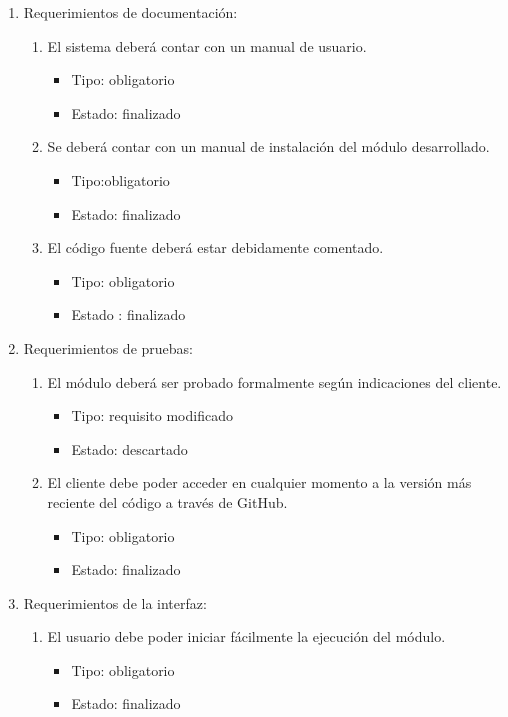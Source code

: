 \begin{enumerate}
\item Requerimientos de documentación:
\begin{enumerate}
	\item El sistema deberá contar con un manual de usuario.
	\begin{itemize}
		\item Tipo: obligatorio
		\item Estado: finalizado
	\end{itemize}
	\item Se deberá contar con un manual de instalación del módulo desarrollado.
	\begin{itemize}
	 \item Tipo:obligatorio
	 \item Estado: finalizado
	\end{itemize}
	\item El código fuente deberá estar debidamente comentado.
	\begin{itemize}
		\item Tipo: obligatorio
		\item Estado : finalizado
	\end{itemize}
\end{enumerate}
\item Requerimientos de pruebas:
\begin{enumerate}
	\item El módulo deberá ser probado formalmente según indicaciones del cliente.
	\begin{itemize}
		\item Tipo: requisito modificado
		\item Estado: descartado
	\end{itemize}
	\item El cliente debe poder acceder en cualquier momento a la versión más reciente del código a través de GitHub.
	\begin{itemize}
	 \item Tipo: obligatorio
	 \item Estado: finalizado
	\end{itemize}
\end{enumerate}
\item Requerimientos de la interfaz:
\begin{enumerate}
	\item El usuario debe poder iniciar fácilmente la ejecución del módulo.
	\begin{itemize}
		\item Tipo: obligatorio
		\item Estado: finalizado

\end{itemize}
\end{enumerate}
\end{enumerate}
